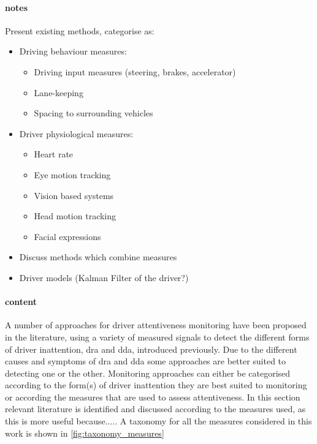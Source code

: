 \documentclass[11pt, parskip=half*,twoside=false]{scrbook}
\begin{document}
\paragraph{notes}
Present existing methods, categorise as:
\begin{itemize}
	\item Driving behaviour measures:
	\begin{itemize}
		\item Driving input measures (steering, brakes, accelerator)
		\item Lane-keeping
		\item Spacing to surrounding vehicles
	\end{itemize}
	\item Driver physiological measures:
	\begin{itemize}
		\item Heart rate
		\item Eye motion tracking
		\item Vision based systems
		\item Head motion tracking
		\item Facial expressions
	\end{itemize}
	\item Discuss methods which combine measures
	\item Driver models (Kalman Filter of the driver?)
\end{itemize}

\paragraph{content}
A number of approaches for driver attentiveness monitoring have been proposed in the literature, using a variety of measured signals to detect the different forms of driver inattention, \gls{dra} and \gls{dda}, introduced previously. Due to the different causes and symptoms of \gls{dra} and \gls{dda} some approaches are better suited to detecting one or the other. Monitoring approaches can either be categorised according to the form(s) of driver inattention they are best suited to monitoring or according the measures that are used to assess attentiveness. In this section relevant literature is identified and discussed according to the measures used, as this is more useful because..... A taxonomy for all the measures considered in this work is shown in \cref{fig:taxonomy_measures}
\end{document}
